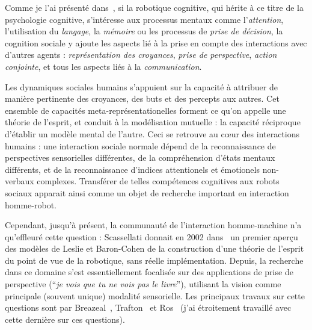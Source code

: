 \documentclass[a4paper]{article}
\begin{document}
Comme je l'ai présenté dans~\cite{lemaignan2014human}, si la robotique
cognitive, qui hérite à ce titre de la psychologie cognitive, s'intéresse aux
processus mentaux comme l'\emph{attention}, l'utilisation du \emph{langage}, la
\emph{mémoire} ou les processus de \emph{prise de décision}, la cognition
sociale y ajoute les aspects lié à la prise en compte des interactions avec
d'autres agents : \emph{représentation des croyances}, \emph{prise de
perspective}, \emph{action conjointe}, et tous les aspects liés à la
\emph{communication}.

Les dynamiques sociales humains s'appuient sur la capacité à attribuer de
manière pertinente des croyances, des buts et des percepts aux autres. Cet
ensemble de capacités meta-représentationelles forment ce qu'on appelle une
théorie de l'esprit, et conduit à la modélisation mutuelle : la capacité
réciproque d'établir un modèle mental de l'autre. Ceci se retrouve au c\oe ur
des interactions humains : une interaction sociale normale dépend de la
reconnaissance de perspectives sensorielles différentes, de la compréhension
d'états mentaux différents, et de la reconnaissance d'indices attentionels et
émotionels non-verbaux complexes. Transférer de telles compétences cognitives aux
robots sociaux apparait ainsi comme un objet de recherche important en
interaction homme-robot.

Cependant, jusqu'à présent, la communauté de l'interaction homme-machine n'a
qu'effleuré cette question : Scassellati donnait en 2002
dans~\cite{scassellati2002theory} un premier aperçu des modèles de Leslie et
Baron-Cohen de la construction d'une théorie de l'esprit du point de vue de la
robotique, sans réelle implémentation. Depuis, la recherche dans ce domaine
s'est essentiellement focalisée sur des applications de prise de perspective
(``\emph{je vois que tu ne vois pas le livre}''), utilisant la vision comme
principale (souvent unique) modalité sensorielle. Les principaux travaux sur
cette questions sont par Breazeal~\cite{breazeal2006using},
Trafton~\cite{Trafton2005} et Ros~\cite{Ros2010} (j'ai étroitement travaillé
avec cette dernière sur ces questions).
\end{document}
